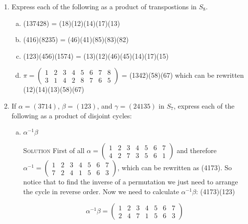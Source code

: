 \documentclass[twoside]{amsart}
\newcommand{\solution}{\textsc{Solution}\xspace}
\begin{document}
\begin{enumerate}[A.]
\begin{enumerate}[1]
      \item Express each of the following as a product of transpostions
      in $S_8$.

      \begin{enumerate}[(a)]
         \item (137428) = (18)(12)(14)(17)(13)

	 \item (416)(8235) = (46)(41)(85)(83)(82)

	 \item (123)(456)(1574) = (13)(12)(46)(45)(14)(17)(15)

	 \item $\pi = \begin{pmatrix}
	                 1 & 2 & 3 & 4 & 5 & 6 & 7 & 8 \\
			 3 & 1 & 4 & 2 & 8 & 7 & 6 & 5
	              \end{pmatrix}$ = (1342)(58)(67) which
		      can be rewritten (12)(14)(13)(58)(67)
      \end{enumerate}

      \item If $\alpha = (3714)$, $\beta = (123)$, and $\gamma = (24135)$
      in $S_7$, express each of the following as a product of disjoint cycles:

      \begin{enumerate}[(a)]
         \item $\alpha^{-1}\beta$

	 \solution First of all $\alpha = 
	    \begin{pmatrix}
	       1 & 2 & 3 & 4 & 5 & 6 & 7 \\
	       4 & 2 & 7 & 3 & 5 & 6 & 1
	    \end{pmatrix}$ and therefore $\alpha^{-1} = 
	    \begin{pmatrix}
	       1 & 2 & 3 & 4 & 5 & 6 & 7 \\
	       7 & 2 & 4 & 1 & 5 & 6 & 3
	    \end{pmatrix}$, which can be rewritten as (4173). So notice
	    that to find the inverse of a permutation we just need to arrange
	    the cycle in reverse order. Now we need to calculate
	    $\alpha^{-1}\beta$: (4173)(123)

	    \[ \alpha^{-1}\beta = 
	       \begin{pmatrix}
	          1 & 2 & 3 & 4 & 5 & 6 & 7 \\
		  2 & 4 & 7 & 1 & 5 & 6 & 3
	       \end{pmatrix}
	    \]


\end{enumerate}
\end{enumerate}
\end{enumerate}
\end{document}
